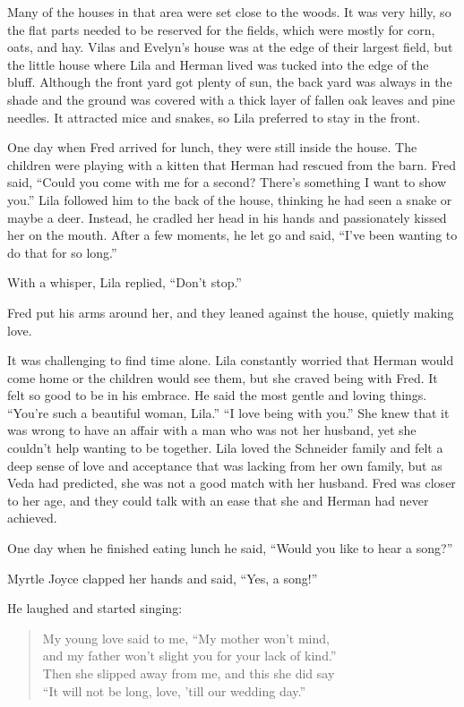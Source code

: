 \documentclass[
  letterpaper,
]{book}
\begin{document}
Many of the houses in that area were set close to the woods. It was very
hilly, so the flat parts needed to be reserved for the fields, which
were mostly for corn, oats, and hay. Vilas and Evelyn's house was at the
edge of their largest field, but the little house where Lila and Herman
lived was tucked into the edge of the bluff. Although the front yard got
plenty of sun, the back yard was always in the shade and the ground was
covered with a thick layer of fallen oak leaves and pine needles. It
attracted mice and snakes, so Lila preferred to stay in the front.

One day when Fred arrived for lunch, they were still inside the house.
The children were playing with a kitten that Herman had rescued from the
barn. Fred said, ``Could you come with me for a second? There's
something I want to show you.'' Lila followed him to the back of the
house, thinking he had seen a snake or maybe a deer. Instead, he cradled
her head in his hands and passionately kissed her on the mouth. After a
few moments, he let go and said, ``I've been wanting to do that for so
long.''

With a whisper, Lila replied, ``Don't stop.''

Fred put his arms around her, and they leaned against the house, quietly
making love.

It was challenging to find time alone. Lila constantly worried that
Herman would come home or the children would see them, but she craved
being with Fred. It felt so good to be in his embrace. He said the most
gentle and loving things. ``You're such a beautiful woman, Lila.'' ``I
love being with you.'' She knew that it was wrong to have an affair with
a man who was not her husband, yet she couldn't help wanting to be
together. Lila loved the Schneider family and felt a deep sense of love
and acceptance that was lacking from her own family, but as Veda had
predicted, she was not a good match with her husband. Fred was closer to
her age, and they could talk with an ease that she and Herman had never
achieved.

One day when he finished eating lunch he said, ``Would you like to hear
a song?''

Myrtle Joyce clapped her hands and said, ``Yes, a song!''

He laughed and started singing:

\begin{quote}
My young love said to me, ``My mother won't mind,\\
and my father won't slight you for your lack of kind.''\\
Then she slipped away from me, and this she did say\\
``It will not be long, love, 'till our wedding day.''
\end{quote}
\end{document}
